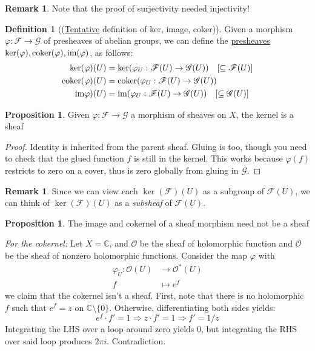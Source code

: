 \documentclass[10pt,reqno]{amsart}
\theoremstyle{definition}
\newtheorem{definition}[theorem]{Definition}
\newtheorem{proposition}[theorem]{Proposition}
\newtheorem{remark}[theorem]{Remark}
\theoremstyle{remark}
\numberwithin{equation}{section}
\numberwithin{theorem}{section}
\newcommand{\C}{{\mathbb C}}
\newcommand{\OO}{{\mathcal O}}
\newcommand{\FF}{{\mathscr F}}
\newcommand{\GG}{{\mathscr G}}
\begin{document}
\begin{remark} Note that the proof of surjectivity needed injectivity!
\end{remark}

\begin{definition}[(\underline{Tentative} definition of ker, image, coker)] Given a morphism $\varphi: \FF \to \GG$ of presheaves of abelian groups, we can define the \underline{presheaves} $\ker(\varphi), \textup{coker}(\varphi), \textup{im}(\varphi)$, as follows:
\begin{align*}
\ker(\varphi)(U) &= \ker(\varphi_U: \FF(U) \to \GG(U)) \quad [\subseteq \FF(U)]\\
\textup{coker} (\varphi)(U) &= \textup{coker}(\varphi_U: \FF(U) \to \GG(U)) \\
\textup{im}\varphi)(U) &= \textup{im}(\varphi_U: \FF(U) \to \GG(U)) \quad [\subseteq \GG(U)]\\
\end{align*}
\end{definition}

\begin{proposition} Given $\varphi: \FF \to \GG$ a morphism of sheaves on $X$, the kernel is a sheaf
\end{proposition}
\begin{proof} Identity is inherited from the parent sheaf. Gluing is too, though you need to check that the glued function $f$ is still in the kernel. This works because $\varphi(f)$ restricts to zero on a cover, thus is zero globally from gluing in $\GG$.
\end{proof}

\begin{remark} Since we can view each $\ker(\FF)(U)$ as a subgroup of $\FF(U)$, we can think of $\ker(\FF)(U)$ as a \textit{subsheaf} of $\FF(U)$.
\end{remark}

\begin{proposition} The image and cokernel of a sheaf morphism need not be a sheaf
\end{proposition}
\textit{For the cokernel:} Let $X = \C$, and $\OO$ be the sheaf of holomorphic function and $\OO$ be the sheaf of nonzero holomorphic functions. Consider the map $\varphi$ with
\begin{align*}
\varphi_U: \OO(U) &\to \OO^*(U)\\
f & \mapsto e^f
\end{align*}
we claim that the cokernel isn't a sheaf. First, note that there is no holomorphic $f$ such that $e^f = z$ on $\C \setminus \{0\}$. Otherwise, differentiating both sides yields:
\[e^f \cdot f' = 1 \Rightarrow z \cdot f' = 1 \Rightarrow f' = 1/z\]
Integrating the LHS over a loop around zero yields $0$, but integrating the RHS over said loop produces $2\pi i$. Contradiction.
\end{document}
